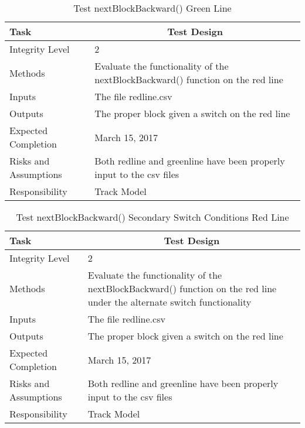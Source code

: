 \documentclass[]{article}
\begin{document}
\begin{table}[H]
	\centering
	\caption{Test nextBlockBackward() Green Line}
	\begin{tabular}{|l|l|}
		\hline
		Task & \multicolumn{1}{c|}{Test Design} \\ \hline
		Integrity Level & 2 \\ \hline
		Methods & \parbox[t]{10cm}{Evaluate the functionality of the nextBlockBackward() function on the red line} \\ \hline
		Inputs &  The file redline.csv \\ \hline
		Outputs &  The proper block given a switch on the red line\\ \hline
		Expected Completion & March 15, 2017\\ \hline
		Risks and Assumptions & Both redline and greenline have been properly input to the csv files \\ \hline
		Responsibility & Track Model\\ \hline
	\end{tabular}
\end{table}

\begin{table}[H]
	\centering
	\caption{Test nextBlockBackward() Secondary Switch Conditions Red Line}
	\begin{tabular}{|l|l|}
		\hline
		Task & \multicolumn{1}{c|}{Test Design} \\ \hline
		Integrity Level & 2 \\ \hline
		Methods & \parbox[t]{10cm}{Evaluate the functionality of the nextBlockBackward() function on the red line under the alternate switch functionality}\\ \hline
		Inputs &  The file redline.csv \\ \hline
		Outputs &  The proper block given a switch on the red line\\ \hline
		Expected Completion & March 15, 2017\\ \hline
		Risks and Assumptions & Both redline and greenline have been properly input to the csv files \\ \hline
		Responsibility & Track Model\\ \hline
	\end{tabular}
\end{table}
\end{document}
